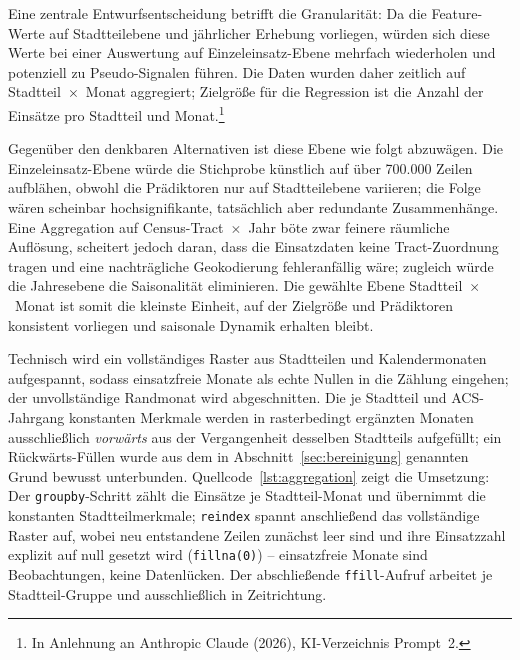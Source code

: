 Eine zentrale Entwurfsentscheidung betrifft die Granularität: Da die
Feature-Werte auf Stadtteilebene und jährlicher Erhebung vorliegen, würden
sich diese Werte bei einer Auswertung auf Einzeleinsatz-Ebene mehrfach
wiederholen und potenziell zu Pseudo-Signalen führen. Die Daten wurden daher
zeitlich auf Stadtteil~$\times$~Monat aggregiert; Zielgröße für die
Regression ist die Anzahl der Einsätze pro Stadtteil und
Monat.\footnote{In Anlehnung an Anthropic Claude (2026), KI-Verzeichnis
Prompt~2.}

Gegenüber den denkbaren Alternativen ist diese Ebene wie folgt abzuwägen.
Die Einzeleinsatz-Ebene würde die Stichprobe künstlich auf über 700.000
Zeilen aufblähen, obwohl die Prädiktoren nur auf Stadtteilebene variieren;
die Folge wären scheinbar hochsignifikante, tatsächlich aber redundante
Zusammenhänge. Eine Aggregation auf Census-Tract~$\times$~Jahr böte zwar
feinere räumliche Auflösung, scheitert jedoch daran, dass die Einsatzdaten
keine Tract-Zuordnung tragen und eine nachträgliche Geokodierung
fehleranfällig wäre; zugleich würde die Jahresebene die Saisonalität
eliminieren. Die gewählte Ebene Stadtteil~$\times$~Monat ist somit die
kleinste Einheit, auf der Zielgröße und Prädiktoren konsistent vorliegen
und saisonale Dynamik erhalten bleibt.

Technisch wird ein vollständiges Raster aus Stadtteilen und Kalendermonaten
aufgespannt, sodass einsatzfreie Monate als echte Nullen in die Zählung
eingehen; der unvollständige Randmonat wird abgeschnitten. Die je Stadtteil
und ACS-Jahrgang konstanten Merkmale werden in rasterbedingt ergänzten
Monaten ausschließlich \emph{vorwärts} aus der Vergangenheit desselben
Stadtteils aufgefüllt; ein Rückwärts-Füllen wurde aus dem in
Abschnitt~\ref{sec:bereinigung} genannten Grund bewusst unterbunden.
Quellcode~\ref{lst:aggregation} zeigt die Umsetzung: Der
\texttt{groupby}-Schritt zählt die Einsätze je Stadtteil-Monat und übernimmt
die konstanten Stadtteilmerkmale; \texttt{reindex} spannt anschließend das
vollständige Raster auf, wobei neu entstandene Zeilen zunächst leer sind und
ihre Einsatzzahl explizit auf null gesetzt wird (\texttt{fillna(0)}) --
einsatzfreie Monate sind Beobachtungen, keine Datenlücken. Der abschließende
\texttt{ffill}-Aufruf arbeitet je Stadtteil-Gruppe und ausschließlich in
Zeitrichtung.


